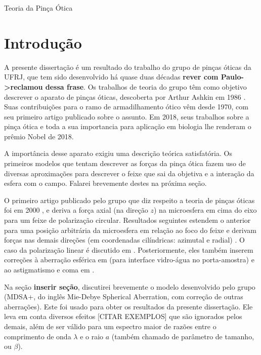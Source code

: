 \begin{chapter}{Teoria da Pinça Ótica}
\label{cap2}


\section{Introdução}

\hspace{5 mm}A presente dissertação é um resultado do trabalho do grupo de pinças óticas da UFRJ, que tem sido desenvolvido há quase duas décadas {\bf rever com Paulo->reclamou dessa frase}. Os trabalhos de teoria do grupo têm como objetivo descrever o aparato de pinças óticas, descoberta por Arthur Ashkin em 1986\cite{Ashkin1986} \cite{Ashkin1977}. Suas contribuições para o ramo de armadilhamento ótico vêm desde 1970, com seu primeiro artigo publicado sobre o assunto\cite{Ashkin1970}.
Em 2018, seus trabalhos sobre a pinça ótica e toda a sua importancia para aplicação em biologia lhe renderam o prêmio Nobel de 2018. 

A importância desse aparato exigiu uma descrição teórica satisfatória. Os primeiros modelos que tentam descrever as forças da pinça ótica fazem uso de diversas aproximações para descrever o feixe que sai da objetiva e a interação da esfera com o campo. Falarei brevemente destes na próxima seção.

O primeiro artigo publicado pelo grupo que diz respeito a teoria de pinças óticas foi em 2000 \cite{Neto2000}, e deriva a força axial (na direção $z$) na microesfera em cima do eixo para um feixe de polarização circular. Resultados seguintes estendem o anterior para uma posição arbitrária da microesfera em relação ao foco do feixe e derivam forças nas demais direções (em coordenadas cilíndricas: azimutal e radial) \cite{Mazolli2003}. O caso da polarização linear é discutido em \cite{Dutra2007}. Posteriormente, eles também inserem correções à aberração esférica em \cite{Viana2007} (para interface vidro-água no porta-amostra) e ao astigmatismo e coma em \cite{Dutra2014}.

Na seção {\bf inserir seção}, discutirei brevemente o modelo desenvolvido pelo grupo (MDSA+, do inglês Mie-Debye Spherical Aberration, com correção de outras aberrações). Este foi usado para obter os resultados da presente dissertação. Ele leva em conta diversos efeitos [CITAR EXEMPLOS] que são ignorados pelos demais, além de ser válido para um espectro maior de razões entre o comprimento de onda $\lambda$ e o raio $a$ (também chamado de parâmetro de tamanho, ou $\beta$).


\end{chapter}
